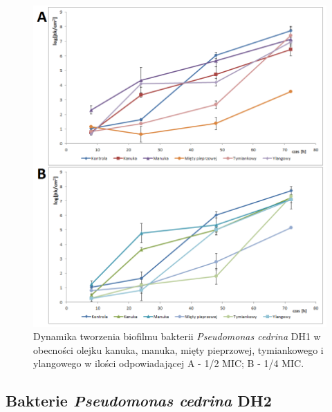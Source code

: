 \documentclass[11pt,a4paper]{report}
\begin{document}
\begin{figure}[!h]
\begin{center}
\includegraphics[scale=0.7]{img/dh1-b.png}
\caption{Dynamika tworzenia biofilmu bakterii \textit{Pseudomonas cedrina} DH1 w obecności olejku kanuka, manuka, mięty pieprzowej, tymiankowego i ylangowego w ilości odpowiadającej A - 1/2 MIC; B - 1/4 MIC.}\label{dh1-b}
\end{center} 
\end{figure}

\clearpage

\subsection{Bakterie \textit{Pseudomonas cedrina} DH2}
\end{document}
